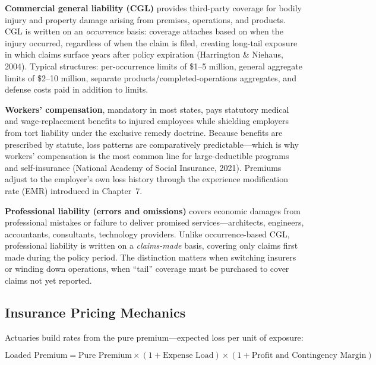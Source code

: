\documentclass[11pt,openany]{book}
\begin{document}
\textbf{Commercial general liability (CGL)} provides third-party coverage for
bodily injury and property damage arising from premises, operations, and
products. CGL is written on an \emph{occurrence} basis: coverage attaches
based on when the injury occurred, regardless of when the claim is filed,
creating long-tail exposure in which claims surface years after policy
expiration (Harrington \& Niehaus, 2004). Typical structures: per-occurrence
limits of \$1--5 million, general aggregate limits of \$2--10 million,
separate products/completed-operations aggregates, and defense costs paid in
addition to limits.

\textbf{Workers' compensation}, mandatory in most states, pays statutory
medical and wage-replacement benefits to injured employees while shielding
employers from tort liability under the exclusive remedy doctrine. Because
benefits are prescribed by statute, loss patterns are comparatively
predictable---which is why workers' compensation is the most common line for
large-deductible programs and self-insurance (National Academy of Social
Insurance, 2021). Premiums adjust to the employer's own loss history through
the experience modification rate (EMR) introduced in
Chapter~7.

\textbf{Professional liability (errors and omissions)} covers economic
damages from professional mistakes or failure to deliver promised
services---architects, engineers, accountants, consultants, technology
providers. Unlike occurrence-based CGL, professional liability is written on
a \emph{claims-made} basis, covering only claims first made during the policy
period. The distinction matters when switching insurers or winding down
operations, when ``tail'' coverage must be purchased to cover claims not yet
reported.

\subsection{Insurance Pricing Mechanics}
\label{subsec:pricing-mechanics}

Actuaries build rates from the pure premium---expected loss per unit of
exposure:

\[
\text{Loaded Premium} = \text{Pure Premium}
\times (1 + \text{Expense Load})
\times (1 + \text{Profit and Contingency Margin})
\]
\end{document}
